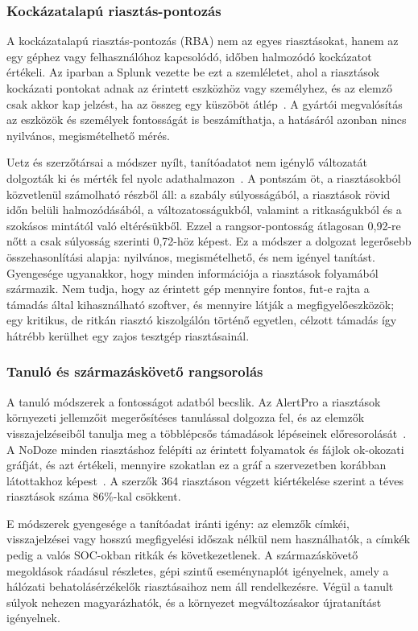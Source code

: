 \subsubsection{Kockázatalapú riasztás-pontozás}
A kockázatalapú riasztás-pontozás (\ac{RBA}) nem az egyes riasztásokat, hanem az egy géphez vagy felhasználóhoz kapcsolódó, időben halmozódó kockázatot értékeli. Az iparban a Splunk vezette be ezt a szemléletet, ahol a riasztások kockázati pontokat adnak az érintett eszközhöz vagy személyhez, és az elemző csak akkor kap jelzést, ha az összeg egy küszöböt átlép~\cite{splunkrba}. A gyártói megvalósítás az eszközök és személyek fontosságát is beszámíthatja, a hatásáról azonban nincs nyilvános, megismételhető mérés.

Uetz és szerzőtársai a módszer nyílt, tanítóadatot nem igénylő változatát dolgozták ki és mérték fel nyolc adathalmazon~\cite{uetz2026rba}. A pontszám öt, a riasztásokból közvetlenül számolható részből áll: a szabály súlyosságából, a riasztások rövid időn belüli halmozódásából, a változatosságukból, valamint a ritkaságukból és a szokásos mintától való eltérésükből. Ezzel a rangsor-pontosság átlagosan 0,92-re nőtt a csak súlyosság szerinti 0,72-höz képest. Ez a módszer a dolgozat legerősebb összehasonlítási alapja: nyilvános, megismételhető, és nem igényel tanítást. Gyengesége ugyanakkor, hogy minden információja a riasztások folyamából származik. Nem tudja, hogy az érintett gép mennyire fontos, fut-e rajta a támadás által kihasználható szoftver, és mennyire látják a megfigyelőeszközök; egy kritikus, de ritkán riasztó kiszolgálón történő egyetlen, célzott támadás így hátrébb kerülhet egy zajos tesztgép riasztásainál.

\subsubsection{Tanuló és származáskövető rangsorolás}
A tanuló módszerek a fontosságot adatból becslik. Az AlertPro a riasztások környezeti jellemzőit megerősítéses tanulással dolgozza fel, és az elemzők visszajelzéseiből tanulja meg a többlépcsős támadások lépéseinek előresorolását~\cite{wang2024alertpro}. A NoDoze minden riasztáshoz felépíti az érintett folyamatok és fájlok ok-okozati gráfját, és azt értékeli, mennyire szokatlan ez a gráf a szervezetben korábban látottakhoz képest~\cite{hassan2019}. A szerzők 364 riasztáson végzett kiértékelése szerint a téves riasztások száma 86\%-kal csökkent.

E módszerek gyengesége a tanítóadat iránti igény: az elemzők címkéi, visszajelzései vagy hosszú megfigyelési időszak nélkül nem használhatók, a címkék pedig a valós SOC-okban ritkák és következetlenek. A származáskövető megoldások ráadásul részletes, gépi szintű eseménynaplót igényelnek, amely a hálózati behatolásérzékelők riasztásaihoz nem áll rendelkezésre. Végül a tanult súlyok nehezen magyarázhatók, és a környezet megváltozásakor újratanítást igényelnek.

